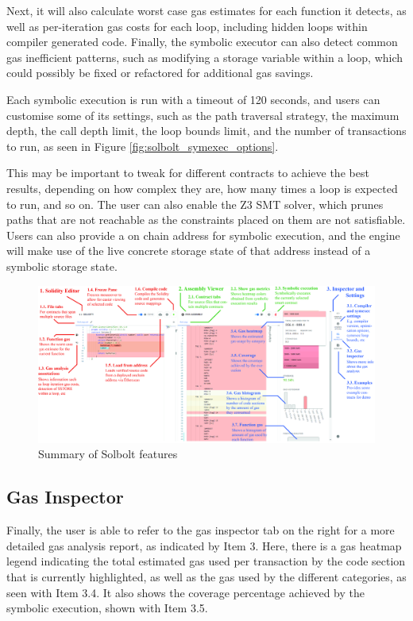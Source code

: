 Next, it will also calculate worst case gas estimates for each function it detects, as 
well as per-iteration gas costs for
each loop, including hidden loops within compiler generated code. Finally, the
symbolic executor can also detect common gas inefficient patterns, such as modifying a 
storage variable within a loop, which could possibly be fixed or refactored for 
additional gas savings.

Each symbolic execution is run with a timeout of 120 seconds, and users can customise
some of its settings, such as the path traversal strategy, the maximum depth, 
the call depth limit, the loop bounds limit, and the number of transactions to run, 
as seen in Figure \ref{fig:solbolt_symexec_options}. 

This
may be important to tweak for different contracts to achieve the best results,
depending on how complex they are, how many times a loop is expected to run, and so on.
The user can also enable the Z3 SMT solver, which prunes paths that are not reachable as
the constraints placed on them are not satisfiable. 
Users can also provide a on chain address for symbolic execution, 
and the engine will make use of the live concrete storage state of that address instead of
a symbolic storage state.

\begin{figure}
  \centering
  \includegraphics[width=\textwidth]{./figures/implementation/summary}
  \caption{Summary of Solbolt features}
  \label{fig:solbolt_summary}
\end{figure}

\subsection{Gas Inspector}

Finally, the user is able to refer to the gas inspector tab on the right for a more detailed
gas analysis report, as indicated
by Item 3. Here, there is a gas heatmap legend indicating the total estimated gas used
per transaction by the code section that is currently highlighted, 
as well as the gas used by the different categories, as seen with Item 3.4.
It also shows the coverage percentage achieved by the symbolic execution, shown with Item 3.5. 


